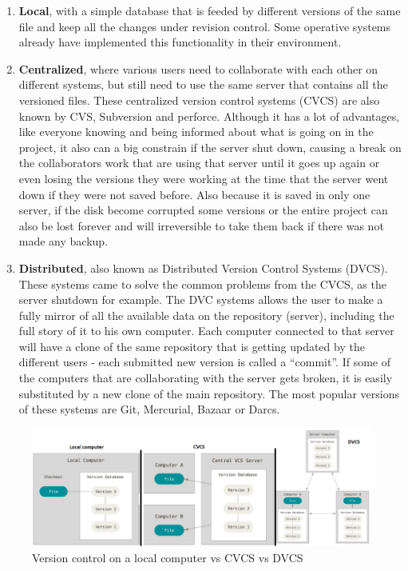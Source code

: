\documentclass[mim_thesis.tex]{subfiles}
\begin{document}
\begin{enumerate}
\item \textbf{Local}, with a simple database that is feeded by different versions of the same file and keep all the changes under revision control. Some operative systems already have implemented this functionality in their environment. 
\item \textbf{Centralized}, where various users need to collaborate with each other on different systems, but still need to use the same server that contains all the versioned files. These centralized version control systems (CVCS) are also known by CVS, Subversion and perforce. Although it has a lot of advantages, like everyone knowing and being informed about what is going on in the project, it also can a big constrain if the server shut down, causing a break on the collaborators work that are using that server until it goes up again or even losing the versions they were working at the time that the server went down if they were not saved before. Also because it is saved in only one server, if the disk become corrupted some versions or the entire project can also be lost forever and will irreversible to take them back if there was not made any backup.
\item \textbf{Distributed}, also known as Distributed Version Control Systems (DVCS). These systems came to solve the common problems from the CVCS, as the server shutdown for example. The DVC systems allows the user to make a fully mirror of all the available data on the repository (server), including the full story of it to his own computer. Each computer connected to that server will have a clone of the same repository that is getting updated by the different users - each submitted new version is called a “commit”. If some of the computers that are collaborating with the server gets broken, it is easily substituted by a new clone of the main repository. The most popular versions of these systems are Git, Mercurial, Bazaar or Darcs. 
\end{enumerate}
    
\begin{figure}[H]
	\centering
    \includegraphics[width=1\textwidth]{img/version_control_comp.PNG}
	\caption{Version control on a local computer vs CVCS vs DVCS}
	\label{fig:version_control_comp}
\end{figure}
\end{document}
